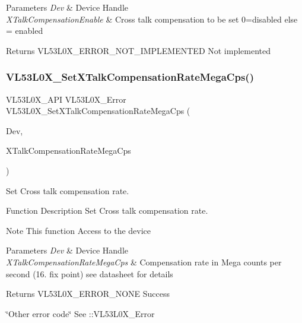 \begin{DoxyParams}{Parameters}
{\em Dev} & Device Handle \\
\hline
{\em X\+Talk\+Compensation\+Enable} & Cross talk compensation to be set 0=disabled else = enabled \\
\hline
\end{DoxyParams}
\begin{DoxyReturn}{Returns}
V\+L53\+L0\+X\+\_\+\+E\+R\+R\+O\+R\+\_\+\+N\+O\+T\+\_\+\+I\+M\+P\+L\+E\+M\+E\+N\+T\+ED Not implemented 
\end{DoxyReturn}
\mbox{\label{group__VL53L0X__parameters__group_ga5a9549bdb784e68ef58663c21542f7ad}} 
\subsubsection{\texorpdfstring{V\+L53\+L0\+X\+\_\+\+Set\+X\+Talk\+Compensation\+Rate\+Mega\+Cps()}{VL53L0X\_SetXTalkCompensationRateMegaCps()}}
{\footnotesize\ttfamily V\+L53\+L0\+X\+\_\+\+A\+PI V\+L53\+L0\+X\+\_\+\+Error V\+L53\+L0\+X\+\_\+\+Set\+X\+Talk\+Compensation\+Rate\+Mega\+Cps (\begin{DoxyParamCaption}\item[{\hyperlink{group__VL53L0X__platform__group_ga2d6405308b1dd524b462f1b8fb97d167}{V\+L53\+L0\+X\+\_\+\+D\+EV}}]{Dev,  }\item[{\hyperlink{vl53l0x__types_8h_afb910790161809fc76e1a274a6349384}{Fix\+Point1616\+\_\+t}}]{X\+Talk\+Compensation\+Rate\+Mega\+Cps }\end{DoxyParamCaption})}



Set Cross talk compensation rate. 

\begin{DoxyParagraph}{Function Description}
Set Cross talk compensation rate.
\end{DoxyParagraph}
\begin{DoxyNote}{Note}
This function Access to the device
\end{DoxyNote}

\begin{DoxyParams}{Parameters}
{\em Dev} & Device Handle \\
\hline
{\em X\+Talk\+Compensation\+Rate\+Mega\+Cps} & Compensation rate in Mega counts per second (16. fix point) see datasheet for details \\
\hline
\end{DoxyParams}
\begin{DoxyReturn}{Returns}
V\+L53\+L0\+X\+\_\+\+E\+R\+R\+O\+R\+\_\+\+N\+O\+NE Success 

\char`\"{}\+Other error code\char`\"{} See \+::\+V\+L53\+L0\+X\+\_\+\+Error 
\end{DoxyReturn}
